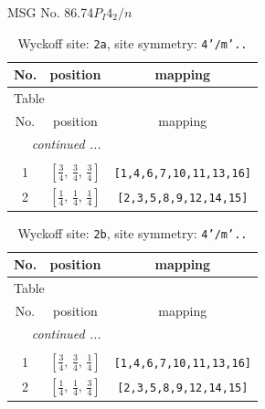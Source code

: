 \documentclass[fleqn,8pt]{jsarticle}
\begin{document}
\setcounter{MaxMatrixCols}{32}

\renewcommand{\tablename}{Table~}
\renewcommand{\figurename}{Figure~}
\begin{center}
\LARGE
MSG No. 86.74\quad$P_{I}4_{2}/n$
\end{center}
\renewcommand{\arraystretch}{1.2}
\begin{longtable}{ccc}
\caption{Wyckoff site: {\tt 2a}, site symmetry: {\tt 4'/m'..}}
 \\
 \hline \hline
No. & position & mapping \\ \hline \endfirsthead

\multicolumn{2}{l}{\tablename\ \thetable{}} \\
 \hline \hline
No. & position & mapping \\ \hline \endhead

 \hline \hline
\multicolumn{2}{r}{\footnotesize\it continued ...} \\ \endfoot

 \hline \hline
\multicolumn{2}{r}{} \\ \endlastfoot

1 & $\left[ \frac{3}{4},\, \frac{3}{4},\, \frac{3}{4} \right]$ & {\tt [1,4,6,7,10,11,13,16]} \\ \hline
2 & $\left[ \frac{1}{4},\, \frac{1}{4},\, \frac{1}{4} \right]$ & {\tt [2,3,5,8,9,12,14,15]} \\
\end{longtable}
\renewcommand{\arraystretch}{1.2}
\begin{longtable}{ccc}
\caption{Wyckoff site: {\tt 2b}, site symmetry: {\tt 4'/m'..}}
 \\
 \hline \hline
No. & position & mapping \\ \hline \endfirsthead

\multicolumn{2}{l}{\tablename\ \thetable{}} \\
 \hline \hline
No. & position & mapping \\ \hline \endhead

 \hline \hline
\multicolumn{2}{r}{\footnotesize\it continued ...} \\ \endfoot

 \hline \hline
\multicolumn{2}{r}{} \\ \endlastfoot

1 & $\left[ \frac{3}{4},\, \frac{3}{4},\, \frac{1}{4} \right]$ & {\tt [1,4,6,7,10,11,13,16]} \\ \hline
2 & $\left[ \frac{1}{4},\, \frac{1}{4},\, \frac{3}{4} \right]$ & {\tt [2,3,5,8,9,12,14,15]} \\
\end{longtable}
\end{document}
